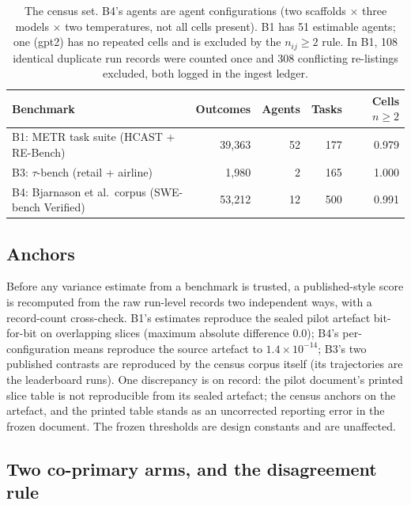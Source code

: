 \documentclass[11pt]{article}
\begin{document}
\begin{table}[t]
\centering\small
\begin{tabular}{@{}lrrrr@{}}
\toprule
Benchmark & Outcomes & Agents & Tasks & Cells $n\geq2$ \\
\midrule
B1: METR task suite (HCAST + RE-Bench) & 39,363 & 52 & 177 & 0.979 \\
B3: $\tau$-bench (retail + airline) & 1,980 & 2 & 165 & 1.000 \\
B4: Bjarnason et al.\ corpus (SWE-bench Verified) & 53,212 & 12 & 500 & 0.991 \\
\bottomrule
\end{tabular}
\caption{The census set. B4's agents are agent configurations (two
scaffolds $\times$ three models $\times$ two temperatures, not all
cells present). B1 has 51 estimable agents; one (gpt2) has no repeated
cells and is excluded by the $n_{ij}\geq2$ rule. In B1, 108 identical
duplicate run records were counted once and 308 conflicting re-listings
excluded, both logged in the ingest ledger.}
\label{tab:census}
\end{table}

\subsection{Anchors}

Before any variance estimate from a benchmark is trusted, a
published-style score is recomputed from the raw run-level records two
independent ways, with a record-count cross-check. B1's estimates
reproduce the sealed pilot artefact bit-for-bit on overlapping slices
(maximum absolute difference 0.0); B4's per-configuration means
reproduce the source artefact to $1.4\times10^{-14}$; B3's two
published contrasts are reproduced by the census corpus itself (its
trajectories are the leaderboard runs). One discrepancy is on record:
the pilot document's printed slice table is not reproducible from its
sealed artefact; the census anchors on the artefact, and the printed
table stands as an uncorrected reporting error in the frozen document.
The frozen thresholds are design constants and are unaffected.

\subsection{Two co-primary arms, and the disagreement rule}
\end{document}
